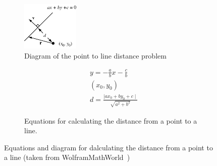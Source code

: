 \begin{figure}[h!]
    \centering

    \begin{subfigure}[b]{\textwidth}
        \centering
        \includegraphics[width=0.3\textwidth]{images/point_to_line.png}
        \caption{Diagram of the point to line distance problem}
        \label{fig:point_to_line_diagram}
    \end{subfigure}

    \begin{subfigure}[b]{\textwidth}
        \begin{subequations}
            \begin{align}
            & y = -\frac{a}{b}x - \frac{c}{b} \label{eq:line}\\
            & (x_{0}, y_{0}) \label{eq:point} \\
            & d = \frac{\mid ax_{0} + by_{0} + c \mid}{\sqrt{a^{2} + b^{2}}} \label{eq:distance}
            \end{align}
        \end{subequations}
        \caption{Equations for calculating the distance from a point to a line.}
        \label{fig:point_to_line_equations}
    \end{subfigure}
    \caption{Equations and diagram for dalculating the distance from a point to a line (taken from WolframMathWorld~\cite{point_to_line})}
    \label{fig:point_to_line_eq}
\end{figure}

